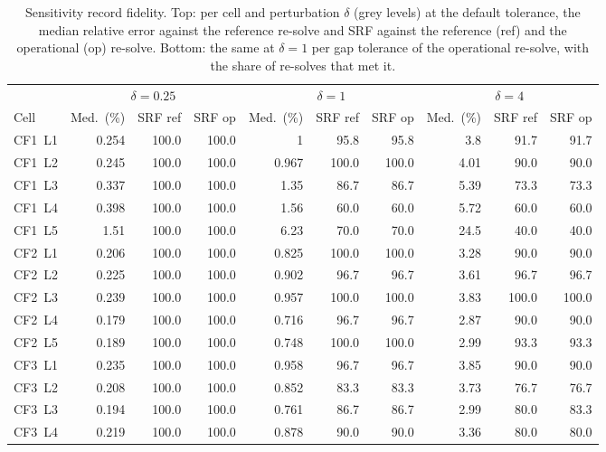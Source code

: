 \documentclass[11pt]{article}
\begin{document}
\begin{table}[htbp]
\centering
\caption{Sensitivity record fidelity. Top: per cell and perturbation $\delta$ (grey levels) at the default tolerance, the median relative error against the reference re-solve and SRF against the reference (ref) and the operational (op) re-solve. Bottom: the same at $\delta = 1$ per gap tolerance of the operational re-solve, with the share of re-solves that met it.}
\label{tab:supp:fidelity}
\footnotesize
\setlength{\tabcolsep}{4pt}
\begin{tabular}{@{}l*{9}{r}@{}}
\toprule
 & \multicolumn{3}{c}{$\delta = 0.25$} & \multicolumn{3}{c}{$\delta = 1$} & \multicolumn{3}{c}{$\delta = 4$} \\
\cmidrule(lr){2-4}\cmidrule(lr){5-7}\cmidrule(l){8-10}
Cell & Med.\ (\%) & SRF ref & SRF op & Med.\ (\%) & SRF ref & SRF op & Med.\ (\%) & SRF ref & SRF op \\
\midrule
CF1~L1 & 0.254 & 100.0 & 100.0 & 1 & 95.8 & 95.8 & 3.8 & 91.7 & 91.7 \\
CF1~L2 & 0.245 & 100.0 & 100.0 & 0.967 & 100.0 & 100.0 & 4.01 & 90.0 & 90.0 \\
CF1~L3 & 0.337 & 100.0 & 100.0 & 1.35 & 86.7 & 86.7 & 5.39 & 73.3 & 73.3 \\
CF1~L4 & 0.398 & 100.0 & 100.0 & 1.56 & 60.0 & 60.0 & 5.72 & 60.0 & 60.0 \\
CF1~L5 & 1.51 & 100.0 & 100.0 & 6.23 & 70.0 & 70.0 & 24.5 & 40.0 & 40.0 \\
CF2~L1 & 0.206 & 100.0 & 100.0 & 0.825 & 100.0 & 100.0 & 3.28 & 90.0 & 90.0 \\
CF2~L2 & 0.225 & 100.0 & 100.0 & 0.902 & 96.7 & 96.7 & 3.61 & 96.7 & 96.7 \\
CF2~L3 & 0.239 & 100.0 & 100.0 & 0.957 & 100.0 & 100.0 & 3.83 & 100.0 & 100.0 \\
CF2~L4 & 0.179 & 100.0 & 100.0 & 0.716 & 96.7 & 96.7 & 2.87 & 90.0 & 90.0 \\
CF2~L5 & 0.189 & 100.0 & 100.0 & 0.748 & 100.0 & 100.0 & 2.99 & 93.3 & 93.3 \\
CF3~L1 & 0.235 & 100.0 & 100.0 & 0.958 & 96.7 & 96.7 & 3.85 & 90.0 & 90.0 \\
CF3~L2 & 0.208 & 100.0 & 100.0 & 0.852 & 83.3 & 83.3 & 3.73 & 76.7 & 76.7 \\
CF3~L3 & 0.194 & 100.0 & 100.0 & 0.761 & 86.7 & 86.7 & 2.99 & 80.0 & 83.3 \\
CF3~L4 & 0.219 & 100.0 & 100.0 & 0.878 & 90.0 & 90.0 & 3.36 & 80.0 & 80.0 \\

\end{tabular}
\end{table}
\end{document}
